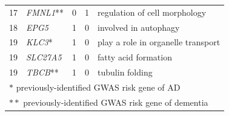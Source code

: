 \begin{table}[H]
\begin{tabular}{lllll}
   17 & \textit{FMNL1}** &   0 &   1 &  regulation of cell morphology  \\ 
   18 & \textit{EPG5} &   1 &   0 &  involved in autophagy  \\ 
   19 & \textit{KLC3}* &   1 &   0 &   play a role in organelle transport \\ 
   19 & \textit{SLC27A5} &   1 &   0 &  fatty acid formation  \\ 
   19 & \textit{TBCB}** &   1 &   0 &   tubulin folding \\ 
  \bottomrule
   \multicolumn{5}{l}{\footnotesize $\ast$ previously-identified GWAS risk gene of AD} \\
    \multicolumn{5}{l}{\footnotesize $\ast\ast$ previously-identified GWAS risk gene of dementia}
\end{tabular}
\label{tab:onlycistrans}
\end{table}



\pagebreak

\nocite{zotero-item-2967}
\nocite{stelzerGeneCardsSuiteGene2016}

